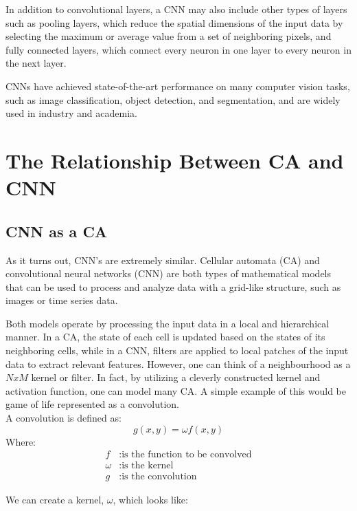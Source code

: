 In addition to convolutional layers, a CNN may also include other types of layers such as pooling layers, which reduce the spatial dimensions of the input data by selecting the maximum or average value from a set of neighboring pixels, and fully connected layers, which connect every neuron in one layer to every neuron in the next layer.

CNNs have achieved state-of-the-art performance on many computer vision tasks, such as image classification, object detection, and segmentation, and are widely used in industry and academia.

\section{The Relationship Between CA and CNN}
\subsection{CNN as a CA}
As it turns out, CNN's are extremely similar. Cellular automata (CA) and convolutional neural networks (CNN) are both types of mathematical models that can be used to process and analyze data with a grid-like structure, such as images or time series data. \cite{PhysRevE.100.032402}

Both models operate by processing the input data in a local and hierarchical manner. In a CA, the state of each cell is updated based on the states of its neighboring cells, while in a CNN, filters are applied to local patches of the input data to extract relevant features. However, one can think of a neighbourhood as a $NxM$ kernel or filter. In fact, by utilizing a cleverly constructed kernel and activation function, one can model many CA. A simple example of this would be game of life represented as a convolution. \\

A convolution is defined as: \\

\begin{equation*}
	g(x,y) = \omega f(x, y)
\end{equation*}
Where:
\begin{align*}
	f &: \text{is the function to be convolved} \\
	\omega &: \text{is the kernel}  \\
	g &: \text{is the convolution} 
\end{align*} 

We can create a kernel, $\omega$, which looks like: \\

